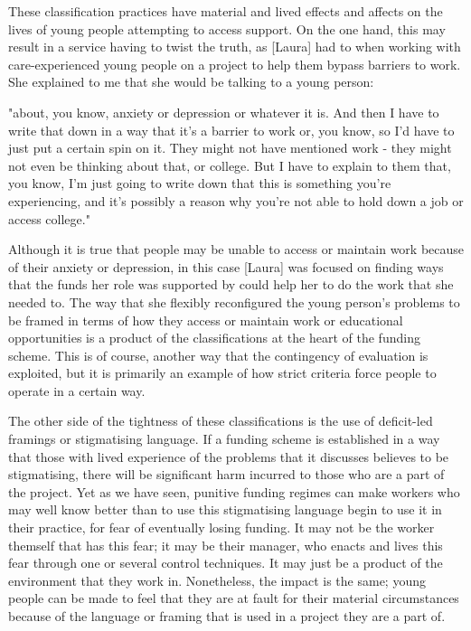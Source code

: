 These classification practices have material and lived effects and affects on the lives of young people attempting to access support. On the one hand, this may result in a service having to twist the truth, as [Laura] had to when working with care-experienced young people on a project to help them bypass barriers to work. She explained to me that she would be talking to a young person:

"about, you know, anxiety or depression or whatever it is. And then I have to write that down in a way that it's a barrier to work or, you know, so I'd have to just put a certain spin on it. They might not have mentioned work - they might not even be thinking about that, or college. But I have to explain to them that, you know, I'm just going to write down that this is something you're experiencing, and it's possibly a reason why you're not able to hold down a job or access college."

Although it is true that people may be unable to access or maintain work because of their anxiety or depression, in this case [Laura] was focused on finding ways that the funds her role was supported by could help her to do the work that she needed to. The way that she flexibly reconfigured the young person's problems to be framed in terms of how they access or maintain work or educational opportunities is a product of the classifications at the heart of the funding scheme. This is of course, another way that the contingency of evaluation is exploited, but it is primarily an example of how strict criteria force people to operate in a certain way.

The other side of the tightness of these classifications is the use of deficit-led framings or stigmatising language. If a funding scheme is established in a way that those with lived experience of the problems that it discusses believes to be stigmatising, there will be significant harm incurred to those who are a part of the project. Yet as we have seen, punitive funding regimes can make workers who may well know better than to use this stigmatising language begin to use it in their practice, for fear of eventually losing funding. It may not be the worker themself that has this fear; it may be their manager, who enacts and lives this fear through one or several control techniques. It may just be a product of the environment that they work in. Nonetheless, the impact is the same; young people can be made to feel that they are at fault for their material circumstances because of the language or framing that is used in a project they are a part of.

